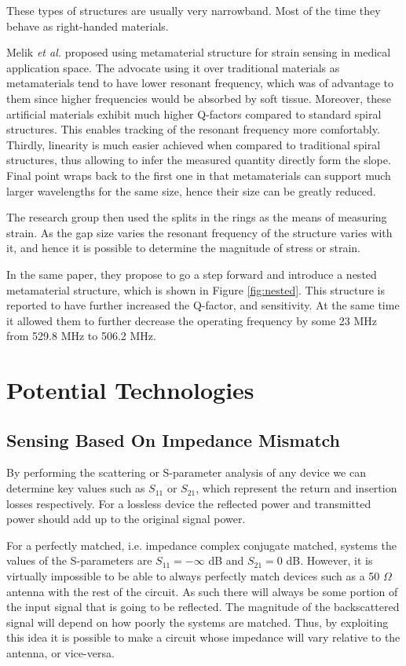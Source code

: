\documentclass[11pt,a4paper]{article}
\begin{document}
These types of structures are usually very narrowband. Most of the time they behave as right-handed materials.

Melik \textit{et al.} \cite{srr} proposed using metamaterial structure for strain sensing in medical application space. The advocate using it over traditional materials as metamaterials tend to have lower resonant frequency, which was of advantage to them since higher frequencies would be absorbed by soft tissue. Moreover, these artificial materials exhibit much higher Q-factors compared to standard spiral structures. This enables tracking of the resonant frequency more comfortably. Thirdly, linearity is much easier achieved when compared to traditional spiral structures, thus allowing to infer the measured quantity directly form the slope. Final point wraps back to the first one in that metamaterials can support much larger wavelengths for the same size, hence their size can be greatly reduced.

The research group then used the splits in the rings as the means of measuring strain. As the gap size varies the resonant frequency of the structure varies with it, and hence it is possible to determine the magnitude of stress or strain.

In the same paper, they propose to go a step forward and introduce a nested metamaterial structure, which is shown in Figure \ref{fig:nested}. This structure is reported to have further increased the Q-factor, and sensitivity. At the same time it allowed them to further decrease the operating frequency by some 23 MHz from 529.8 MHz to 506.2 MHz.

\section{Potential Technologies}

\subsection{Sensing Based On Impedance Mismatch}

By performing the scattering or S-parameter analysis of any device we can determine key values such as $S_{11}$ or $S_{21}$, which represent the return and insertion losses respectively. For a lossless device the reflected power and transmitted power should add up to the original signal power.

For a perfectly matched, i.e. impedance complex conjugate matched, systems the values of the S-parameters are $S_{11} = -\infty$ dB and $S_{21} = 0$ dB. However, it is virtually impossible to be able to always perfectly match devices such as a 50 $\Omega$ antenna with the rest of the circuit. As such there will always be some portion of the input signal that is going to be reflected. The magnitude of the backscattered signal will depend on how poorly the systems are matched. Thus, by exploiting this idea it is possible to make a circuit whose impedance will vary relative to the antenna, or vice-versa.
\end{document}
